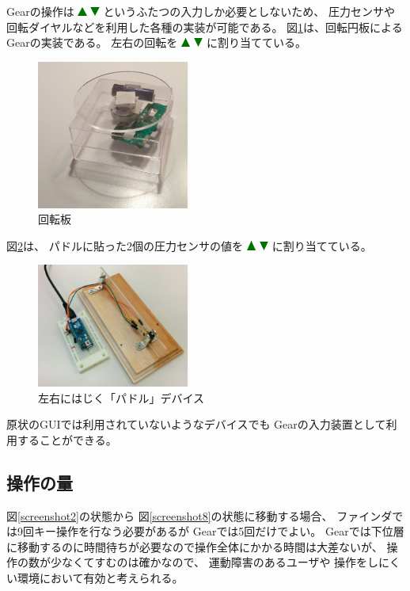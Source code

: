 \documentclass[twoside]{wiss}
\def\GEAR{\textsf{Gear}}
\def\up{ \includegraphics[width=3mm,bb=0 0 36 36]{figures/uptriangle.pdf} }
\def\down{ \includegraphics[width=3mm,bb=0 0 36 36]{figures/downtriangle.pdf} }
\begin{document}

{\GEAR}の操作は{\up}{\down}というふたつの入力しか必要としないため、
圧力センサや回転ダイヤルなどを利用した各種の実装が可能である。
%
図\ref{disk}は、回転円板による{\GEAR}の実装である。
左右の回転を{\up}{\down}に割り当てている。

\begin{figure}[H]
\centerline{\includegraphics[width=50mm,bb=0 0 362 354]{figures/ff2d18e66f9a4655dbb5e22e0bb9a0ae.png}}
\caption{回転板}
\label{disk}
\end{figure}

図\ref{paddle}は、
パドルに貼った2個の圧力センサの値を{\up}{\down}に割り当てている。

\begin{figure}[H]
\centerline{\includegraphics[width=50mm,bb=0 0 514 418]{figures/3c2de63899653056f3c6be835b9aaf43.png}}
\caption{左右にはじく「パドル」デバイス}
\label{paddle}
\end{figure}

\noindent
原状のGUIでは利用されていないようなデバイスでも
{\GEAR}の入力装置として利用することができる。

\subsection{操作の量}

図\ref{screenshot2}の状態から
図\ref{screenshot8}の状態に移動する場合、
ファインダでは9回キー操作を行なう必要があるが
{\GEAR}では5回だけでよい。
{\GEAR}では下位層に移動するのに時間待ちが必要なので操作全体にかかる時間は大差ないが、
操作の数が少なくてすむのは確かなので、
運動障害のあるユーザや
操作をしにくい環境において有効と考えられる。
\end{document}
